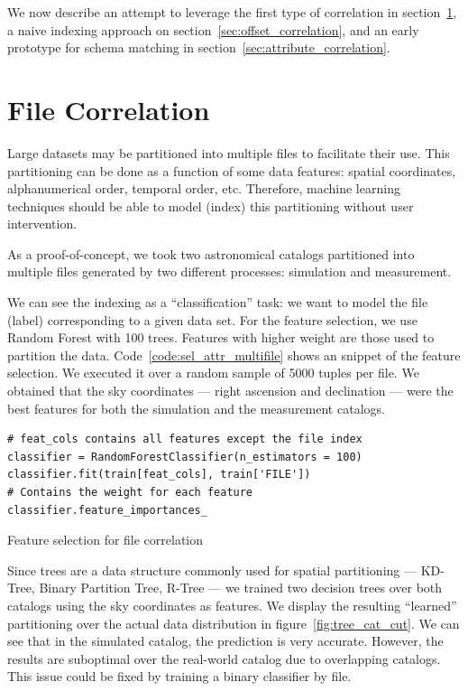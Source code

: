 We now describe an attempt to leverage the first type of correlation in
section~\ref{sec:file_correlation}, a naive indexing approach on section~\ref{sec:offset_correlation},
and an early prototype for schema matching in section~\ref{sec:attribute_correlation}.

\section{File Correlation}
\label{sec:file_correlation}

Large datasets may be partitioned into multiple files to facilitate their use.
This partitioning can be done as a function of some data features: spatial coordinates,
alphanumerical order, temporal order, etc. Therefore, machine learning techniques
should be able to model (index) this partitioning without user intervention.

As a proof-of-concept, we took two astronomical catalogs partitioned into multiple
files generated by two different processes: simulation and measurement.

We can see the indexing as a ``classification'' task: we want to model the file (label)
corresponding to a given data set. For the feature selection, we use Random Forest
with 100 trees. Features with higher weight are those used to partition the data.
Code~\ref{code:sel_attr_multifile} shows an snippet of the feature selection.
We executed it over a random sample of 5000 tuples per file.
We obtained that the sky coordinates --- right ascension and declination --- were
the best features for both the simulation and the measurement catalogs.

\begin{listing}[H]
\begin{verbatim}
# feat_cols contains all features except the file index
classifier = RandomForestClassifier(n_estimators = 100)
classifier.fit(train[feat_cols], train['FILE'])
# Contains the weight for each feature
classifier.feature_importances_
\end{verbatim}
\caption{Feature selection for file correlation}
\label{code:sel_attr_multifile}
\end{listing}

Since trees are a data structure commonly used for spatial partitioning
--- KD-Tree, Binary Partition Tree, R-Tree --- we trained two decision trees over
both catalogs using the sky coordinates as features.
We display the resulting ``learned'' partitioning over the actual data distribution
in figure~\ref{fig:tree_cat_cut}.
We can see that in the simulated catalog, the prediction is very accurate.
However, the results are suboptimal over the real-world catalog due to overlapping catalogs.
This issue could be fixed by training a binary classifier by file.

